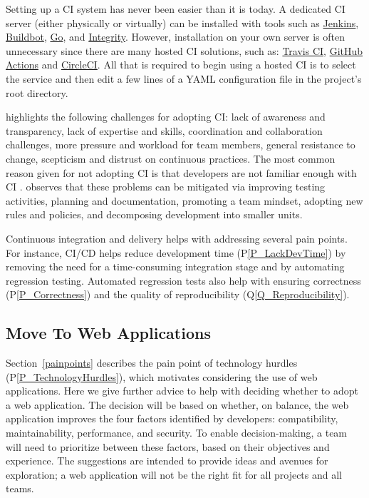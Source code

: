 \documentclass[final, 12pt, 3p, times]{elsarticle}
\newcommand{\ppref}[1]{P\ref{#1}}
\newcommand{\qref}[1]{Q\ref{#1}}
\begin{document}
Setting up a CI system has never been easier than it is today.  A dedicated CI
server (either physically or virtually) can be installed with tools such as
\href{https://www.jenkins.io/} {Jenkins}, \href{http://buildbot.net/}
{Buildbot}, \href{https://www.gocd.org/} {Go}, and
\href{http://integrity.github.io/} {Integrity}. However, installation on your
own server is often unnecessary since there are many hosted CI solutions, such
as: \href{https://travis-ci.org/} {Travis CI},
\href{https://github.com/features/actions} {GitHub Actions} and
\href{https://circleci.com/} {CircleCI}.  All that is required to begin using a
hosted CI is to select the service and then edit a few lines of a YAML
configuration file in the project's root directory.

\cite{ShahinEtAl2017} highlights the following challenges for adopting CI: lack
of awareness and transparency, lack of expertise and skills, coordination and
collaboration challenges, more pressure and workload for team members, general
resistance to change, scepticism and distrust on continuous practices. The most
common reason given for not adopting CI is that developers are not familiar
enough with CI \cite{HiltonEtAl2016}.  \cite{ShahinEtAl2017} observes that
these problems can be mitigated via improving testing activities, planning and
documentation, promoting a team mindset, adopting new rules and policies, and
decomposing development into smaller units.

Continuous integration and delivery helps with addressing several pain points.
For instance, CI/CD helps reduce development time (\ppref{P_LackDevTime}) by
removing the need for a time-consuming integration stage and by automating
regression testing.  Automated regression tests also help with ensuring
correctness (\ppref{P_Correctness}) and the quality of reproducibility
(\qref{Q_Reproducibility}).

\subsection{Move To Web Applications} \label{sec_webapps}

Section~\ref{painpoints} describes the pain point of technology hurdles
(\ppref{P_TechnologyHurdles}), which motivates considering the use of web
applications. Here we give further advice to help with deciding whether to adopt
a web application. The decision will be based on whether, on balance, the web
application improves the four factors identified by developers: compatibility,
maintainability, performance, and security. To enable decision-making, a team
will need to prioritize between these factors, based on their objectives and
experience. The suggestions are intended to provide ideas and avenues for
exploration; a web application will not be the right fit for all projects and
all teams.
\end{document}
